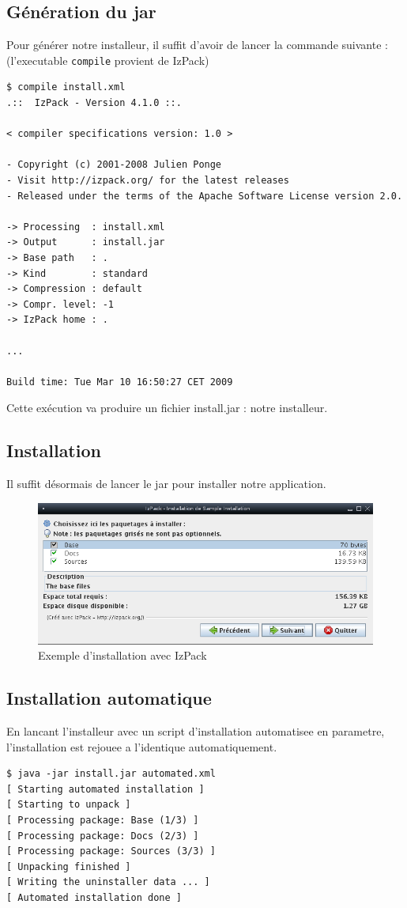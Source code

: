 \subsection{Génération du jar}
Pour générer notre installeur, il suffit d'avoir de lancer la commande suivante : (l'executable \verb|compile| provient de IzPack)
\begin{verbatim}
$ compile install.xml
.::  IzPack - Version 4.1.0 ::.

< compiler specifications version: 1.0 >

- Copyright (c) 2001-2008 Julien Ponge
- Visit http://izpack.org/ for the latest releases
- Released under the terms of the Apache Software License version 2.0.

-> Processing  : install.xml
-> Output      : install.jar
-> Base path   : .
-> Kind        : standard
-> Compression : default
-> Compr. level: -1
-> IzPack home : .

...

Build time: Tue Mar 10 16:50:27 CET 2009
\end{verbatim}
Cette exécution va produire un fichier install.jar : notre installeur.
\subsection{Installation}
Il suffit désormais de lancer le jar pour installer notre application.
\begin{figure}[H]
	\centering
	\includegraphics[width=15cm]{../image/installSample.png}
	\caption{Exemple d'installation avec IzPack}
\end{figure}

\subsection{Installation automatique}
En lancant l'installeur avec un script d'installation automatisee en parametre, l'installation est rejouee a l'identique automatiquement.
\begin{verbatim}
$ java -jar install.jar automated.xml
[ Starting automated installation ]
[ Starting to unpack ]
[ Processing package: Base (1/3) ]
[ Processing package: Docs (2/3) ]
[ Processing package: Sources (3/3) ]
[ Unpacking finished ]
[ Writing the uninstaller data ... ]
[ Automated installation done ]
\end{verbatim}


